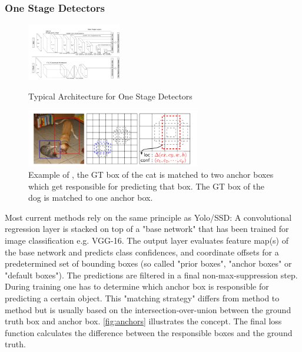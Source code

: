 	\subsubsection{One Stage Detectors}
	
	\begin{figure}[h]
		\centering
		\begin{minipage}{0.4\textwidth}
			\centering
			\includegraphics[height=2.5cm]{fig/architecture}
			\caption{Typical Architecture for One Stage Detectors}
			\label{fig:architecture}
		\end{minipage}
		\hspace{2cm}
		\begin{minipage}{0.4\textwidth}
			\centering
			\includegraphics[height=2.5cm]{fig/anchors}
			\caption{Example of \cite{Liu}, the GT box of the cat is matched to two anchor boxes which get responsible for predicting that box. The GT box of the dog is matched to one anchor box.}
			\label{fig:anchors}
		\end{minipage}
	\end{figure}
	
	Most current methods rely on the same principle as Yolo/SSD: A convolutional regression layer is stacked on top of a "base network" that has been trained for image classification e.g. VGG-16. The output layer evaluates feature map(s) of the base network and predicts class confidences, and coordinate offsets for a predetermined set of bounding boxes (so called "prior boxes", "anchor boxes" or "default boxes"). The predictions are filtered in a final non-max-suppression step. During training one has to determine which anchor box is responsible for predicting a certain object. This "matching strategy" differs from method to method but is usually based on the intersection-over-union between the ground truth box and anchor box. \autoref{fig:anchors} illustrates the concept. The final loss function calculates the difference between the responsible boxes and the ground truth. 
	
